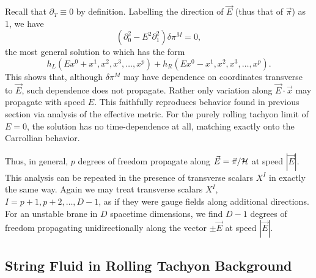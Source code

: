 \documentclass[a4paper,12pt]{article}
\newcommand{\p}{\partial}
\begin{document}
Recall that $\partial_T\equiv 0$ by definition. Labelling the
direction of $\vec E$ (thus that of $\vec\pi$) as 1, we have
\begin{equation}
\left(\p_0^2 - E^2\p_1^2\right)\delta \pi^M =0 ,
\end{equation}
the most general solution to which has the form
\begin{equation}
h_L(Ex^0+x^1,x^2,x^3,\dots,x^p)+h_R(Ex^0-x^1,x^2,x^3,\dots,x^p).
\end{equation}
This shows that, although $\delta \pi^M$ 
may have dependence on coordinates
transverse to $\vec E$, such dependence does not propagate.
Rather only variation along $\vec E \cdot \vec x$ may 
propagate with speed $E$. This faithfully reproduces behavior found in
previous section via analysis of the effective metric. For the purely
rolling tachyon limit of $E=0$, the solution has no time-dependence
at all, matching exactly onto the Carrollian behavior.

Thus, in general, $p$ degrees of freedom propagate along $\vec E=\vec 
\pi/{\cal H}$ at speed $|\vec E|$.
This analysis can be repeated in the presence of transverse scalars
$X^I$ in exactly the same way. Again we may treat transverse scalars
$X^I$, $I=p+1,p+2,\dots, D-1$, as if they were gauge fields along
additional directions. For an unstable brane in $D$ spacetime
dimensions, we find   $D-1$  degrees of freedom
propagating unidirectionally  along the vector $\pm\vec E$ at speed
$|\vec E|$. 

\subsection{String Fluid in Rolling Tachyon Background}
\end{document}
